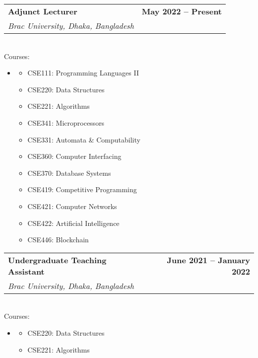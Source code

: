 \documentclass[letterpaper,10.5pt]{article}
\makeatletter
\newcommand{\resumeSubheading}[4]{
  \vspace{-2pt}\item
    \begin{tabular*}{1.0\textwidth}[t]{l@{\extracolsep{\fill}}r}
      \textbf{#1} & \textbf{\small #2} \\
      \textit{\small#3} & \textit{\small #4} \\
    \end{tabular*}\vspace{-7pt}
}
\newcommand{\resumeSubHeadingListStart}{\begin{itemize}[leftmargin=0.0in, label={}]}
\makeatother
\begin{document}
\resumeSubheading
{Adjunct Lecturer}{May 2022 -- Present}
{Brac University, Dhaka, Bangladesh}{}\\
\vspace{0.1in}
\small{Courses:}
\vspace{-.18in}
\begin{itemize}[leftmargin=.5in]
  \item[\null]
    \begin{multicols}{3}
      \begin{itemize}[leftmargin=0.2in, itemsep=0pt, parsep=3pt]
        \setlength\itemsep{-3pt}
        \item\small CSE111: Programming Languages II
        \item CSE220: Data Structures
        \item CSE221: Algorithms
        \item CSE341: Microprocessors
        \item CSE331: Automata \& Computability
        \item CSE360: Computer Interfacing
        \item CSE370: Database Systems
        \item CSE419: Competitive Programming
        \item CSE421: Computer Networks
        \item CSE422: Artificial Intelligence
        \item CSE446: Blockchain

      \end{itemize}
    \end{multicols}
\end{itemize}
\vspace{-6pt}
\resumeSubheading
{Undergraduate Teaching Assistant}{June 2021 -- January 2022}
{Brac University, Dhaka, Bangladesh}{}\\
\vspace{0.1in}
\small{Courses:}
\vspace{-.18in}
\begin{itemize}[leftmargin=.5in]
  \item[\null]
    \begin{multicols}{3}
      \begin{itemize}[leftmargin=0.2in, itemsep=0pt, parsep=3pt]
        \setlength\itemsep{-3pt}
        \item\small CSE220: Data Structures
        \item CSE221: Algorithms
      \end{itemize}
    \end{multicols}
\end{itemize}
\end{document}
